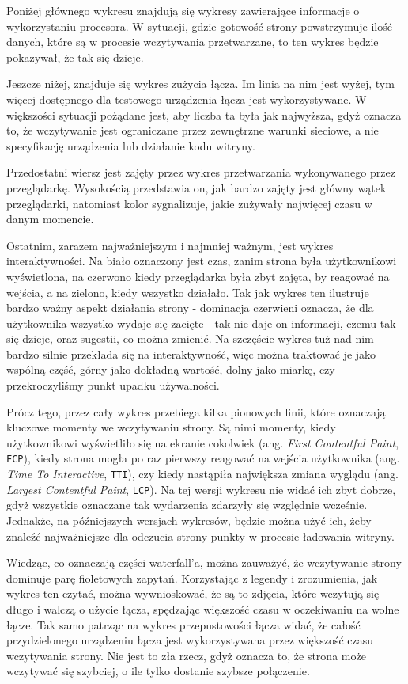 \documentclass[licencjacka]{pracadypl}
\begin{document}
Poniżej głównego wykresu znajdują się wykresy zawierające informacje o wykorzystaniu procesora. W sytuacji, gdzie gotowość strony powstrzymuje ilość danych, które są w procesie wczytywania przetwarzane, to ten wykres będzie pokazywał, że tak się dzieje.

Jeszcze niżej, znajduje się wykres zużycia łącza. Im linia na nim jest wyżej, tym więcej dostępnego dla testowego urządzenia łącza jest wykorzystywane. W większości sytuacji pożądane jest, aby liczba ta była jak najwyższa, gdyż oznacza to, że wczytywanie jest ograniczane przez zewnętrzne warunki sieciowe, a nie specyfikację urządzenia lub działanie kodu witryny.

Przedostatni wiersz jest zajęty przez wykres przetwarzania wykonywanego przez przeglądarkę. Wysokością przedstawia on, jak bardzo zajęty jest główny wątek przeglądarki, natomiast kolor sygnalizuje, jakie zużywały najwięcej czasu w danym momencie.

Ostatnim, zarazem najważniejszym i najmniej ważnym, jest wykres interaktywności. \linebreak Na biało oznaczony jest czas, zanim strona była użytkownikowi wyświetlona, na czerwono kiedy przeglądarka była zbyt zajęta, by reagować na wejścia, a na zielono, kiedy wszystko działało. Tak jak wykres ten ilustruje bardzo ważny aspekt działania strony - dominacja czerwieni oznacza, że dla użytkownika wszystko wydaje się zacięte - tak nie daje on informacji, czemu tak się dzieje, oraz sugestii, co można zmienić. Na szczęście wykres tuż nad nim bardzo silnie przekłada się na interaktywność, więc można traktować je jako wspólną część, górny jako dokładną wartość, dolny jako miarkę, czy przekroczyliśmy punkt upadku używalności. 

Prócz tego, przez cały wykres przebiega kilka pionowych linii, które oznaczają kluczowe momenty we wczytywaniu strony. Są nimi momenty, kiedy użytkownikowi wyświetliło się na ekranie cokolwiek (ang. \emph{First Contentful Paint}, \texttt{FCP}), kiedy strona mogła po raz pierwszy reagować na wejścia użytkownika (ang. \emph{Time To Interactive}, \texttt{TTI}), czy kiedy nastąpiła największa zmiana wyglądu (ang. \emph{Largest Contentful Paint}, \texttt{LCP}). Na tej wersji wykresu nie widać ich zbyt dobrze, gdyż wszystkie oznaczane tak wydarzenia zdarzyły się względnie wcześnie. Jednakże, na późniejszych wersjach wykresów, będzie można użyć ich, żeby znaleźć najważniejsze dla odczucia strony punkty w procesie ładowania witryny.

Wiedząc, co oznaczają części waterfall'a, można zauważyć, że wczytywanie strony dominuje parę fioletowych zapytań. Korzystając z legendy i zrozumienia, jak wykres ten czytać, można wywnioskować, że są to zdjęcia, które wczytują się długo i walczą o użycie łącza, spędzając większość czasu w oczekiwaniu na wolne łącze. Tak samo patrząc na wykres przepustowości łącza widać, że całość przydzielonego urządzeniu łącza jest wykorzystywana przez większość czasu wczytywania strony. Nie jest to zła rzecz, gdyż oznacza to, że strona może wczytywać się szybciej, o ile tylko dostanie szybsze połączenie.
\end{document}
